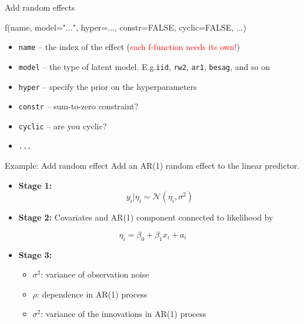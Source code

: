 \documentclass[
  handout]{beamer}
\newenvironment{Shaded}{\begin{snugshade}}{\end{snugshade}}
\newcommand{\AttributeTok}[1]{\textcolor[rgb]{0.77,0.63,0.00}{#1}}
\newcommand{\ConstantTok}[1]{\textcolor[rgb]{0.00,0.00,0.00}{#1}}
\newcommand{\FunctionTok}[1]{\textcolor[rgb]{0.00,0.00,0.00}{#1}}
\newcommand{\NormalTok}[1]{#1}
\newcommand{\StringTok}[1]{\textcolor[rgb]{0.31,0.60,0.02}{#1}}
\providecommand{\tightlist}{%
  \setlength{\itemsep}{0pt}\setlength{\parskip}{0pt}}
\begin{document}
\begin{frame}[fragile]{Add random effects}
\protect\hypertarget{add-random-effects-1}{}
\begin{Shaded}
\begin{Highlighting}[]
\FunctionTok{f}\NormalTok{(name, }\AttributeTok{model=}\StringTok{"..."}\NormalTok{, }\AttributeTok{hyper=}\NormalTok{...,}
                 \AttributeTok{constr=}\ConstantTok{FALSE}\NormalTok{, }\AttributeTok{cyclic=}\ConstantTok{FALSE}\NormalTok{, ...)}
\end{Highlighting}
\end{Shaded}

\begin{itemize}
\tightlist
\item
  \texttt{name} -- the index of the effect
  (\textcolor{red}{each f-function needs its own!})
\item
  \texttt{model} -- the type of latent model. E.g.\texttt{iid},
  \texttt{rw2}, \texttt{ar1}, \texttt{besag}, and so on
\item
  \texttt{hyper} -- specify the prior on the hyperparameters
\item
  \texttt{constr} -- sum-to-zero constraint?
\item
  \texttt{cyclic} -- are you cyclic?
\item
  \texttt{...}
\end{itemize}
\end{frame}

\begin{frame}{Example: Add random effect}
\protect\hypertarget{example-add-random-effect}{}
Add an AR(1) random effect to the linear predictor.

\begin{itemize}
\item
  \textbf{Stage 1:} \[
    y_i|\eta_i \sim \mathcal{N}(\eta_i, \sigma^2)
  \]
\item
  \textbf{Stage 2:} Covariates and AR(1) component connected to
  likelihood by
\end{itemize}

\[
    \eta_i = \beta_0 + \beta_1 x_i + a_i
\]

\begin{itemize}
\item
  \textbf{Stage 3:}

  \begin{itemize}
  \item
    \(\sigma^2\): variance of observation noise
  \item
    \(\rho\): dependence in AR(1) process
  \item
    \(\sigma^2\): variance of the innovations in AR(1) process
  \end{itemize}
\end{itemize}
\end{frame}
\end{document}

